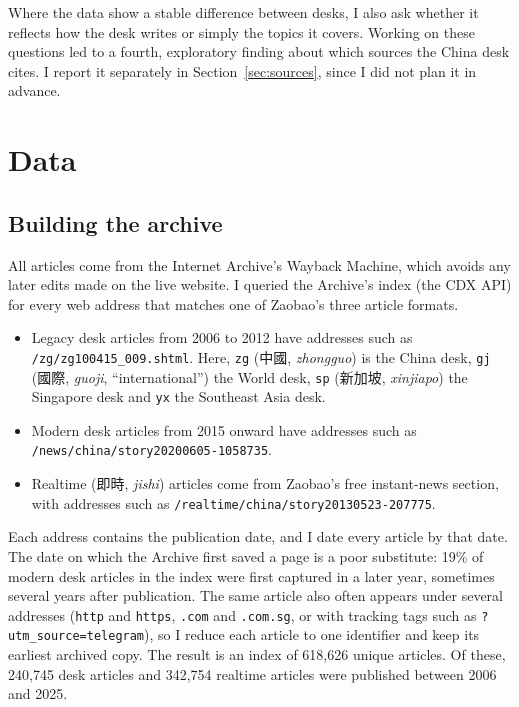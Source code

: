 \documentclass[11pt]{article}
\begin{document}
\noindent Where the data show a stable difference between desks, I also ask whether it reflects how the desk writes or simply the topics it covers. Working on these questions led to a fourth, exploratory finding about which sources the China desk cites. I report it separately in Section~\ref{sec:sources}, since I did not plan it in advance.

\section{Data}

\subsection{Building the archive}

All articles come from the Internet Archive's Wayback Machine, which avoids any later edits made on the live website. I queried the Archive's index (the CDX API) for every web address that matches one of Zaobao's three article formats.

\begin{itemize}
\item Legacy desk articles from 2006 to 2012 have addresses such as \nolinkurl{/zg/zg100415_009.shtml}. Here, \texttt{zg} (中國, \textit{zhongguo}) is the China desk, \texttt{gj} (國際, \textit{guoji}, ``international'') the World desk, \texttt{sp} (新加坡, \textit{xinjiapo}) the Singapore desk and \texttt{yx} the Southeast Asia desk.
\item Modern desk articles from 2015 onward have addresses such as \nolinkurl{/news/china/story20200605-1058735}.
\item Realtime (即時, \textit{jishi}) articles come from Zaobao's free instant-news section, with addresses such as \nolinkurl{/realtime/china/story20130523-207775}.
\end{itemize}

Each address contains the publication date, and I date every article by that date. The date on which the Archive first saved a page is a poor substitute: 19\% of modern desk articles in the index were first captured in a later year, sometimes several years after publication. The same article also often appears under several addresses (\texttt{http} and \texttt{https}, \texttt{.com} and \texttt{.com.sg}, or with tracking tags such as \nolinkurl{?utm_source=telegram}), so I reduce each article to one identifier and keep its earliest archived copy. The result is an index of 618,626 unique articles. Of these, 240,745 desk articles and 342,754 realtime articles were published between 2006 and 2025.
\end{document}
